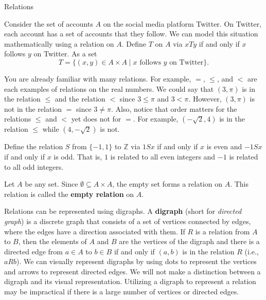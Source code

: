 \begin{section}{Relations}
\begin{example}\label{ex:Twitter}
Consider the set of accounts $A$ on the social media platform Twitter.  On Twitter, each account has a set of accounts that they follow.  We can model this situation mathematically using a relation on $A$.  Define $T$ on $A$ via $xTy$ if and only if $x$ follows $y$ on Twitter. As a set
\[
T=\{(x,y)\in A\times A\mid x\text{ follows }y\text{ on Twitter}\}.
\]
\end{example}

\begin{example}
You are already familiar with many relations.  For example, $=$, $\leq$, and $<$ are each examples of relations on the real numbers. We could say that $(3,\pi)$ is in the relation $\leq$ and the relation $<$ since $3\leq \pi$ and $3<\pi$.  However, $(3,\pi)$ is not in the relation $=$ since $3\neq \pi$.  Also, notice that order matters for the relations $\leq$ and $<$ yet does not for $=$. For example, $(-\sqrt{2}, 4)$ is in the relation $\leq$ while $(4,-\sqrt{2})$ is not.
\end{example}


\begin{example}
Define the relation $S$ from $\{-1,1\}$ to $\mathbb{Z}$ via $1Sx$ if and only if $x$ is even and $-1Sx$ if and only if $x$ is odd.  That is, $1$ is related to all even integers and $-1$ is related to all odd integers.
\end{example}

\begin{example}
Let $A$ be any set.  Since $\emptyset \subseteq A\times A$, the empty set forms a relation on $A$. This relation is called the \textbf{empty relation} on $A$.
\end{example}

Relations can be represented using digraphs. A \textbf{digraph} (short for \emph{directed graph}) is a discrete graph that consists of a set of vertices connected by edges, where the edges have a direction associated with them. If $R$ is a relation from $A$ to $B$, then the elements of $A$ and $B$ are the vertices of the digraph and there is a directed edge from $a\in A$ to $b\in B$ if and only if $(a,b)$ is in the relation $R$ (i.e., $aR b$). We can visually represent digraphs by using dots to represent the vertices and arrows to represent directed edges. We will not make a distinction between a digraph and its visual representation. Utilizing a digraph to represent a relation may be impractical if there is a large number of vertices or directed edges. 


\end{section}
